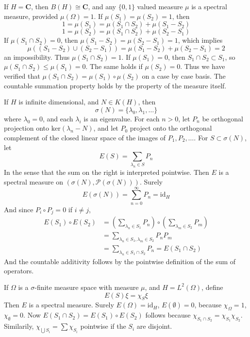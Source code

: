 \begin{example}
    If $H = \mathbf{C}$, then $B(H) \cong \mathbf{C}$, and any $\{ 0, 1 \}$ valued measure $\mu$ is a spectral measure, provided $\mu(\Omega) = 1$. If $\mu(S_1) = \mu(S_2) = 1$, then
    \[ 1 = \mu(S_1) = \mu(S_1 \cap S_2) + \mu(S_1 - S_2) \]
    \[ 1 = \mu(S_2) = \mu(S_1 \cap S_2) + \mu(S_2 - S_1) \]
    If $\mu(S_1 \cap S_2) = 0$, then $\mu(S_1 - S_2) = \mu(S_2 - S_1) = 1$, which implies
    \[ \mu((S_1 - S_2) \cup (S_2 - S_1)) = \mu(S_1 - S_2) + \mu(S_2 - S_1) = 2 \]
    an impossibility. Thus $\mu(S_1 \cap S_2) = 1$. If $\mu(S_1) = 0$, then $S_1 \cap S_2 \subset S_1$, so $\mu(S_1 \cap S_2) \leq \mu(S_1) = 0$. The same holds if $\mu(S_2) = 0$. Thus we have verified that $\mu(S_1 \cap S_2) = \mu(S_1) \circ \mu(S_2)$ on a case by case basis. The countable summation property holds by the property of the measure itself.
\end{example}

\begin{example}
    If $H$ is infinite dimensional, and $N \in K(H)$, then
    \[ \sigma(N) = \{ \lambda_0, \lambda_1, \dots \} \]
    where $\lambda_0 = 0$, and each $\lambda_i$ is an eigenvalue. For each $n > 0$, let $P_n$ be orthogonal projection onto $\text{ker}(\lambda_n - N)$, and let $P_0$ project onto the orthogonal complement of the closed linear space of the images of $P_1, P_2, \dots$. For $S \subset \sigma(N)$, let
    \[ E(S) = \sum_{\lambda_n \in S} P_n \]
    In the sense that the sum on the right is interpreted pointwise. Then $E$ is a spectral measure on $(\sigma(N), \mathcal{P}(\sigma(N)))$. Surely
    \[ E(\sigma(N)) = \sum_{n = 0}^\infty P_n = \text{id}_H \]
    And since $P_i \circ P_j = 0$ if $i \neq j$,
    \begin{align*}
        E(S_1) \circ E(S_2) &= \left( \sum_{\lambda_n \in S_1} P_n \right) \circ  \left( \sum_{\lambda_m \in S_2} P_m \right)\\
        &= \sum_{\lambda_n \in S_1, \lambda_m \in S_2} P_n P_m\\
        &= \sum_{\lambda_n \in S_1 \cap S_2} P_n = E(S_1 \cap S_2)
    \end{align*}
    And the countable additivity follows by the pointwise definition of the sum of operators.
\end{example}

\begin{example}
    If $\Omega$ is a $\sigma$-finite measure space with measure $\mu$, and $H = L^2(\Omega)$, define
    \[ E(S) \xi = \chi_S \xi \]
    Then $E$ is a spectral measure. Surely $E(\Omega) = \text{id}_H$, $E(\emptyset) = 0$, because $\chi_\Omega = 1$, $\chi_\emptyset = 0$. Now $E(S_1 \cap S_2) = E(S_1) \circ E(S_2)$ follows because $\chi_{S_1 \cap S_2} = \chi_{S_1} \chi_{S_2}$. Similarily, $\chi_{\bigcup S_i} = \sum \chi_{S_i}$ pointwise if the $S_i$ are disjoint.
\end{example}



